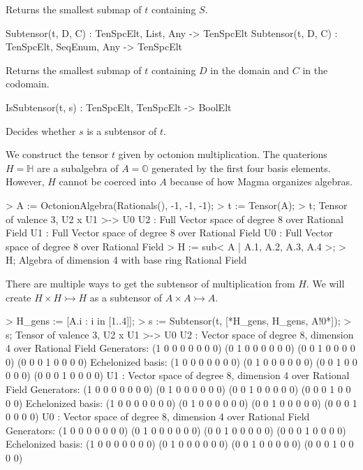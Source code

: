 Returns the smallest submap of $t$ containing $S$.

\begin{intrinsics}
Subtensor(t, D, C) : TenSpcElt, List, Any -> TenSpcElt
Subtensor(t, D, C) : TenSpcElt, SeqEnum, Any -> TenSpcElt
\end{intrinsics}

Returns the smallest submap of $t$ containing $D$ in the domain and $C$ in the 
codomain.

\begin{intrinsics}
IsSubtensor(t, s) : TenSpcElt, TenSpcElt -> BoolElt
\end{intrinsics}

Decides whether $s$ is a subtensor of $t$.

\begin{example}[Subtensors]

We construct the tensor $t$ given by octonion multiplication.
The quaterions $H=\mathbb{H}$ are a subalgebra of $A=\mathbb{O}$ generated by the first four basis elements. 
However, $H$ cannot be coerced into $A$ because of how Magma organizes algebras. 
\begin{code}
> A := OctonionAlgebra(Rationals(), -1, -1, -1);
> t := Tensor(A);
> t;
Tensor of valence 3, U2 x U1 >-> U0
U2 : Full Vector space of degree 8 over Rational Field
U1 : Full Vector space of degree 8 over Rational Field
U0 : Full Vector space of degree 8 over Rational Field
> H := sub< A | A.1, A.2, A.3, A.4 >;
> H;
Algebra of dimension 4 with base ring Rational Field
\end{code}

There are multiple ways to get the subtensor of multiplication from $H$. 
We will create $H\times H\rightarrowtail H$ as a subtensor of $A\times A\rightarrowtail A$. 
\begin{code}
> H_gens := [A.i : i in [1..4]];
> s := Subtensor(t, [*H_gens, H_gens, A!0*]);
> s;
Tensor of valence 3, U2 x U1 >-> U0
U2 : Vector space of degree 8, dimension 4 over Rational Field
Generators:
(1 0 0 0 0 0 0 0)
(0 1 0 0 0 0 0 0)
(0 0 1 0 0 0 0 0)
(0 0 0 1 0 0 0 0)
Echelonized basis:
(1 0 0 0 0 0 0 0)
(0 1 0 0 0 0 0 0)
(0 0 1 0 0 0 0 0)
(0 0 0 1 0 0 0 0)
U1 : Vector space of degree 8, dimension 4 over Rational Field
Generators:
(1 0 0 0 0 0 0 0)
(0 1 0 0 0 0 0 0)
(0 0 1 0 0 0 0 0)
(0 0 0 1 0 0 0 0)
Echelonized basis:
(1 0 0 0 0 0 0 0)
(0 1 0 0 0 0 0 0)
(0 0 1 0 0 0 0 0)
(0 0 0 1 0 0 0 0)
U0 : Vector space of degree 8, dimension 4 over Rational Field
Generators:
(1 0 0 0 0 0 0 0)
(0 1 0 0 0 0 0 0)
(0 0 1 0 0 0 0 0)
(0 0 0 1 0 0 0 0)
Echelonized basis:
(1 0 0 0 0 0 0 0)
(0 1 0 0 0 0 0 0)
(0 0 1 0 0 0 0 0)
(0 0 0 1 0 0 0 0)
\end{code}


\end{example}
